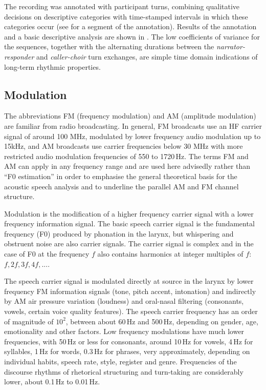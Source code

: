 \documentclass[output=paper,colorlinks,citecolor=brown]{langscibook}
\begin{document}
The recording was annotated with participant turns, combining qualitative decisions on descriptive categories with time-stamped intervals in which these categories occur (see  for a segment of the annotation). Results of the annotation and a basic descriptive analysis are shown in . The low coefficients of variance for the sequences, together with the alternating durations between the \textit{narrator-responder} and \textit{caller-choir} turn exchanges, are simple time domain indications of long-term rhythmic properties.

\subsection{Modulation}

The abbreviations FM (frequency modulation) and AM (amplitude modulation) are familiar from radio broadcasting. In general, FM broadcasts use an HF carrier signal of around 100 MHz, modulated by lower frequency audio modulation up to 15kHz, and AM broadcasts use carrier frequencies below 30 MHz with more restricted audio modulation frequencies of 550 to 1720\,Hz. The terms FM and AM can apply in any frequency range and are used here advisedly rather than “F0 estimation” in order to emphasise the general theoretical basis for the acoustic speech analysis and to underline the parallel AM and FM channel structure.

Modulation is the modification of a higher frequency carrier signal with a lower frequency information signal. The basic speech carrier signal is the fundamental frequency (F0) produced by phonation in the larynx, but whispering and obstruent noise are also carrier signals. The carrier signal is complex and in the case of F0 at the frequency $f$ also contains harmonics at integer multiples of $f$: $f, 2f, 3f, 4f,  ... $.

The speech carrier signal is modulated directly at source in the larynx by lower frequency FM information signals (tone, pitch accent, intonation) and indirectly by AM air pressure variation (loudness) and oral-nasal filtering (consonants, vowels, certain voice quality features). The speech carrier frequency has an order of magnitude of $10^2$, between about 60\,Hz and 500\,Hz, depending on gender, age, emotionality and other factors. Low frequency modulations have much lower frequencies, with 50\,Hz or less for consonants, around 10\,Hz for vowels, 4\,Hz for syllables, 1\,Hz for words, 0.3\,Hz for phrases, very approximately, depending on individual habits, speech rate, style, register and genre. Frequencies of the discourse rhythms of rhetorical structuring and turn-taking are considerably lower, about 0.1\,Hz to 0.01\,Hz.
\end{document}

